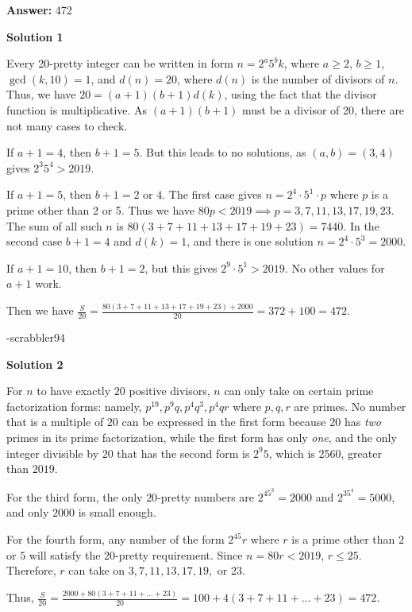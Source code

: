\begin{enumerate}
 
 \textbf{Answer: }472



\textbf{Solution 1}

Every 20-pretty integer can be written in form $n = 2^a 5^b k$, where $a \ge 2$, $b \ge 1$, $\gcd(k,10) = 1$, and $d(n) = 20$, where $d(n)$ is the number of divisors of $n$. Thus, we have $20 = (a+1)(b+1)d(k)$, using the fact that the divisor function is multiplicative. As $(a+1)(b+1)$ must be a divisor of 20, there are not many cases to check.

 If $a+1 = 4$, then $b+1 = 5$. But this leads to no solutions, as $(a,b) = (3,4)$ gives $2^3 5^4 > 2019$.

 If $a+1 = 5$, then $b+1 = 2$ or $4$. The first case gives $n = 2^4 \cdot 5^1 \cdot p$ where $p$ is a prime other than 2 or 5. Thus we have $80p < 2019 \implies p = 3, 7, 11, 13, 17, 19, 23$. The sum of all such $n$ is $80(3+7+11+13+17+19+23) = 7440$. In the second case $b+1 = 4$ and $d(k) = 1$, and there is one solution $n = 2^4 \cdot 5^3 = 2000$.

 If $a+1 = 10$, then $b+1 = 2$, but this gives $2^9 \cdot 5^1 > 2019$. No other values for $a+1$ work.

 Then we have $\frac{S}{20} = \frac{80(3+7+11+13+17+19+23) + 2000}{20} = 372 + 100 = \boxed{472}$.

 -scrabbler94

 



\textbf{Solution 2}

For $n$ to have exactly $20$ positive divisors, $n$ can only take on certain prime factorization forms: namely, $p^{19}, p^9q, p^4q^3, p^4qr$ where $p,q,r$ are primes. No number that is a multiple of $20$ can be expressed in the first form because 20 has \textit{two} primes in its prime factorization, while the first form has only \textit{one}, and the only integer divisible by $20$ that has the second form is $2^{9}5$, which is 2560, greater than $2019$. 

 For the third form, the only $20$-pretty numbers are $2^45^3=2000$ and $2^35^4=5000$, and only $2000$ is small enough. 

 For the fourth form, any number of the form $2^45r$ where $r$ is a prime other than $2$ or $5$ will satisfy the $20$-pretty requirement. Since $n=80r<2019$, $r\le 25$. Therefore, $r$ can take on $3, 7, 11, 13, 17, 19,$ or $23$. 

 Thus, $\frac{S}{20}=\frac{2000+80(3+7+11+...+23)}{20}=100+4(3+7+11+...+23)=\boxed{472}$.


\end{enumerate}
